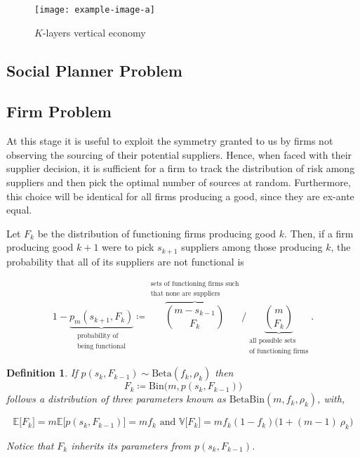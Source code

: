 \documentclass[american, abstract=on]{scrartcl}
\newcommand{\inputTikZ}[2]{%
        \scalebox{#1}{}  
      }
\theoremstyle{plain}
\newtheorem{definition}{Definition}
\newcommand{\E}{\mathbb{E}}
\newcommand{\V}{\mathbb{V}}
\newcommand{\Beta}{\text{Beta}}
\newcommand{\Bin}{\text{Bin}}
\begin{document}
\begin{figure}[H]
  \centering
  \texttt{[image: example-image-a]}
  \caption{$K$-layers vertical economy}
  \label{fig:vertical-economy-diagram}
\end{figure}

\subsection{Social Planner Problem}

\subsection{Firm Problem}

At this stage it is useful to exploit the symmetry granted to us by firms not observing the sourcing of their potential suppliers. Hence, when faced with their supplier decision, it is sufficient for a firm to track the distribution of risk among suppliers and then pick the optimal number of sources at random. Furthermore, this choice will be identical for all firms producing a good, since they are ex-ante equal.

Let $F_k$ be the distribution of functioning firms producing good $k$. Then, if a firm producing good $k + 1$ were to pick $s_{k + 1}$ suppliers among those producing $k$, the probability that all of its suppliers are not functional is

\begin{equation}
  1 - \underbrace{p_m(s_{k + 1}, F_k)}_{\substack{\text{probability of} \\ \text{being functional}}} \coloneqq \overbrace{\binom{m - s_{k-1}}{F_k}}^{\substack{\text{sets of functioning firms such} \\ \text{that none are suppliers}}} \Bigg/ \underbrace{\binom{m}{F_k}}_{\substack{\text{all possible sets} \\ \text{of functioning firms}}}.
\end{equation}

\begin{definition} \label{definition:ptoF}
  If $p(s_k, F_{k-1}) \sim \Beta(f_k, \rho_k)$ then \begin{equation}
    F_k \coloneqq \Bin\Big(m, p(s_k, F_{k-1}) \Big)
  \end{equation} follows a distribution of three parameters known as $\Beta\Bin(m, f_k, \rho_k)$, with,

  \begin{equation}
    \E \big[F_k\big] = m \E \big[p(s_k, F_{k-1})\big] = m f_k \text{ and } \V \big[F_k\big] = m f_k (1 - f_k) \big(1 + (m - 1) \ \rho_k\big)
  \end{equation}

  Notice that $F_k$ inherits its parameters from $p(s_k, F_{k - 1})$.
\end{definition}
\end{document}
